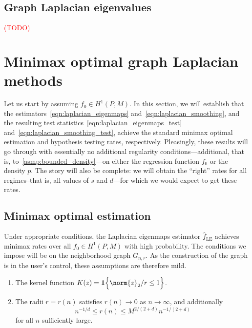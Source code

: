 \documentclass{article}
\newcommand{\1}{\mathbf{1}}
\newcommand{\wh}[1]{\widehat{#1}}
\newcommand{\LE}{\mathrm{LE}}
\theoremstyle{alden}
\theoremstyle{aldenthm}
\theoremstyle{definition}
\theoremstyle{remark}
\begin{document}
\subsection{Graph Laplacian eigenvalues}

\textcolor{red}{(TODO)}

\section{Minimax optimal graph Laplacian methods}
\label{sec:minimax_optimal_graph_Laplacian_methods}

Let us start by assuming $f_0 \in H^1(P,M)$. In this section, we will establish that the estimators~\eqref{eqn:laplacian_eigenmaps} and~\eqref{eqn:laplacian_smoothing}, and the resulting test statistics~\eqref{eqn:laplacian_eigenmaps_test} and~\eqref{eqn:laplacian_smoothing_test}, achieve the standard minimax optimal estimation and hypothesis testing rates, respectively. Pleasingly, these results will go through with essentially no additional regularity conditions---additional, that is, to~\ref{asmp:bounded_density}---on either the regression function $f_0$ or the density $p$. The story will also be complete: we will obtain the ``right'' rates for all regimes--that is, all values of $s$ and $d$---for which we would expect to get these rates.

\subsection{Minimax optimal estimation}

Under appropriate conditions, the Laplacian eigenmaps estimator $\wh{f}_{\LE}$ achieves minimax rates over all $f_0 \in H^1(P,M)$ with high probability. The conditions we impose will be on the neighborhood graph $G_{n,r}$. As the construction of the graph is in the user's control, these assumptions are therefore mild.
\begin{enumerate}[label=(K\arabic*)]
	\item 
	\label{asmp:kernel_form}
	The kernel function $K(z) = \1\Bigl\{\norm{z}_2/r \leq 1 \Bigr\}$.
	\item 
	\label{asmp:kernel_radius_estimation}
	The radii $r = r(n)$ satisfies $r(n) \to 0$ as $n \to \infty$, and additionally
	\begin{equation*}
	n^{-1/d}\leq r(n) \leq M^{2/(2 + d)}n^{-1/(2 + d)}
	\end{equation*}
	for all $n$ sufficiently large.
\end{enumerate}
\end{document}
